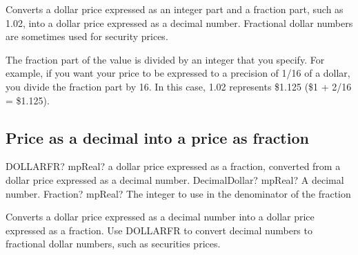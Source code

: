 \vspace{0.3cm}
Converts a dollar price expressed as an integer part and a fraction part, such as 1.02, into a dollar price expressed as a decimal number. Fractional dollar numbers are sometimes used for security prices.

The fraction part of the value is divided by an integer that you specify. For example, if you want your price to be expressed to a precision of 1/16 of a dollar, you divide the fraction part by 16. In this case, 1.02 represents \$1.125 (\$1 + 2/16 = \$1.125).




\subsection{Price as a decimal into a price as fraction}

\begin{mpFunctionsExtract}
	\mpWorksheetFunctionTwoNotImplemented
	{DOLLARFR? mpReal?  a dollar price expressed as a fraction, converted from a dollar price expressed as a decimal number.}
	{DecimalDollar? mpReal? A decimal number.}
	{Fraction? mpReal? The integer to use in the denominator of the fraction}
\end{mpFunctionsExtract}

\vspace{0.3cm}
Converts a dollar price expressed as a decimal number into a dollar price expressed as a fraction. Use DOLLARFR to convert decimal numbers to fractional dollar numbers, such as securities prices.



